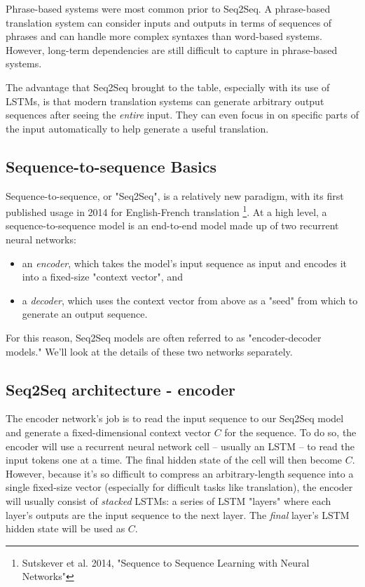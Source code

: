 \documentclass{tufte-handout}
\begin{document}
Phrase-based systems were most common prior to Seq2Seq. A phrase-based translation system can consider inputs and outputs in terms of sequences of phrases and can handle more complex syntaxes than word-based systems. However, long-term dependencies are still difficult to capture in phrase-based systems.

The advantage that Seq2Seq brought to the table, especially with its use of LSTMs, is that modern translation systems can generate arbitrary output sequences after seeing the \textit{entire} input. They can even focus in on specific parts of the input automatically to help generate a useful translation.

\subsection{Sequence-to-sequence Basics}
Sequence-to-sequence, or "Seq2Seq", is a relatively new paradigm, with its first published usage in 2014 for English-French translation \footnote{Sutskever et al. 2014, "Sequence to Sequence Learning with Neural Networks"}. At a high level, a sequence-to-sequence model is an end-to-end model made up of two recurrent neural networks:
\begin{itemize}
\item an \textit{encoder}, which takes the model's input sequence as input and encodes it into a fixed-size "context vector", and
\item a \textit{decoder}, which uses the context vector from above as a "seed" from which to generate an output sequence.
\end{itemize}
For this reason, Seq2Seq models are often referred to as "encoder-decoder models." We'll look at the details of these two networks separately.


\subsection{Seq2Seq architecture - encoder}

The encoder network's job is to read the input sequence to our Seq2Seq model and generate a fixed-dimensional context vector $C$ for the sequence. To do so, the encoder will use a recurrent neural network cell -- usually an LSTM -- to read the input tokens one at a time. The final hidden state of the cell will then become $C$. However, because it's so difficult to compress an arbitrary-length sequence into a single fixed-size vector (especially for difficult tasks like translation), the encoder will usually consist of \textit{stacked} LSTMs: a series of LSTM "layers" where each layer's outputs are the input sequence to the next layer. The \textit{final} layer's LSTM hidden state will be used as $C$.
\end{document}

